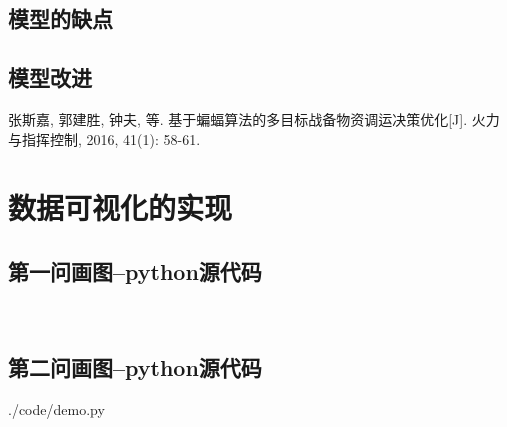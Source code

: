 \documentclass{whutmod}
\begin{document}
		\subsection{模型的缺点}

  		\subsection{模型改进}

  
  
 
	\newpage	%
	\nocite{*}		%
	\begin{thebibliography}{9}%
		张斯嘉, 郭建胜, 钟夫, 等. 基于蝙蝠算法的多目标战备物资调运决策优化[J]. 火力与指挥控制, 2016, 41(1): 58-61.
	
	\end{thebibliography}

	\newpage
	\appendix %
	\section{数据可视化的实现}
		\subsection*{第一问画图--python源代码}
			\begin{lstlisting}[language=python]
			
			\end{lstlisting}
			
		\subsection*{第二问画图--python源代码}
			 {./code/demo.py}
\end{document}
